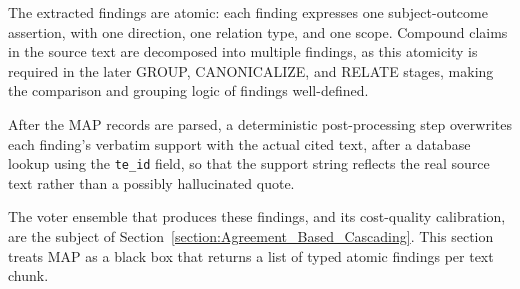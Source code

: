 The extracted findings are atomic: each finding expresses one subject-outcome assertion, with one direction, one relation type, and one scope. Compound claims in the source text are decomposed into multiple findings, as this atomicity is required in the later GROUP, CANONICALIZE, and RELATE stages, making the comparison and grouping logic of findings well-defined.

After the MAP records are parsed, a deterministic post-processing step overwrites each finding's verbatim support with the actual cited text, after a database lookup using the \texttt{te\_id} field, so that the support string reflects the real source text rather than a possibly hallucinated quote.

The voter ensemble that produces these findings, and its cost-quality calibration, are the subject of Section~\ref{section:Agreement_Based_Cascading}. This section treats MAP as a black box that returns a list of typed atomic findings per text chunk.
